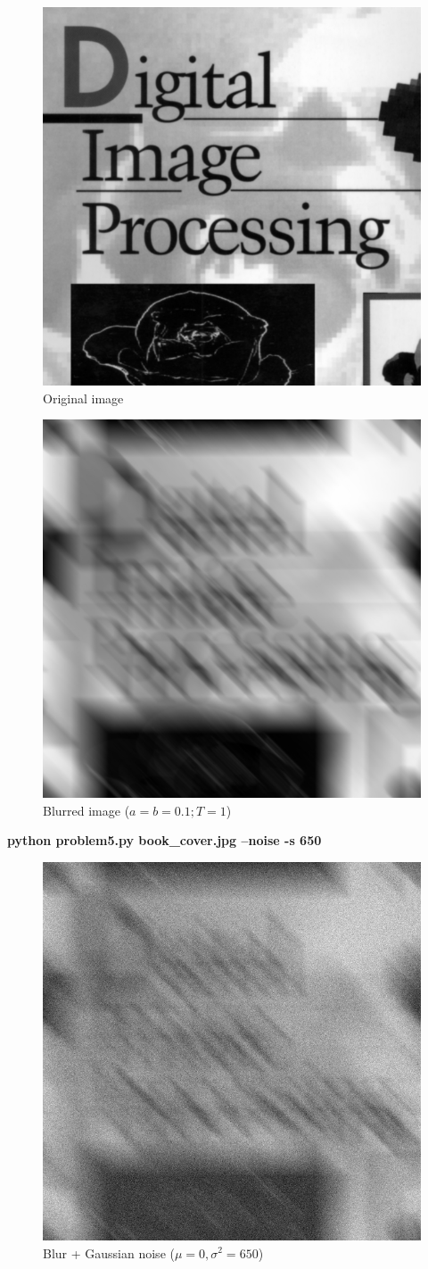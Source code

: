 \begin{figure}[!htb]\centering
    \includegraphics[width=0.6\linewidth]{./images/5/original.jpg}
    \caption{\small{Original image}}
\end{figure}

\begin{figure}[!htb]\centering
    \includegraphics[width=0.6\linewidth]{./images/5/blurred.jpg}
    \caption{\small{Blurred image ($a = b = 0.1; T = 1$)}}\label{diagram:blurred}
\end{figure}


\pagebreak
\textbf{python problem5.py book\_cover.jpg --noise -s 650}

\begin{figure}[!htb]\centering
    \includegraphics[width=0.6\linewidth]{./images/5/blurred_noise.jpg}
    \caption{\small{Blur + Gaussian noise ($\mu = 0, \sigma^2 = 650$)}}\label{diagram:blurred_noise}
\end{figure}


